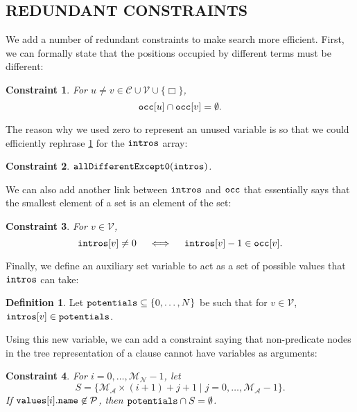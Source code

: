\documentclass[letterpaper]{article}
\newtheorem{constraint}{Constraint}
\theoremstyle{definition}
\newtheorem{definition}{Definition}
\newcommand{\variable}[1]{\texttt{\textup{#1}}}
\newcommand{\predicates}{\mathcal{P}}
\newcommand{\variables}{\mathcal{V}}
\newcommand{\constants}{\mathcal{C}}
\newcommand{\maxArity}{\mathcal{M}_{\mathcal{A}}}
\newcommand{\maxNumNodes}{\mathcal{M}_{\mathcal{N}}}
\begin{document}
\subsection{REDUNDANT CONSTRAINTS}

We add a number of redundant constraints to make search more efficient. First,
we can formally state that the positions occupied by different terms must be
different:

\begin{constraint} \label{constraint:all_diff}
  For $u \ne v \in \constants{} \cup \variables{} \cup \{ \Box \}$,
  \[
    \variable{occ}[u] \cap \variable{occ}[v] = \emptyset.
  \]
\end{constraint}

The reason why we used zero to represent an unused variable is so that we could
efficiently rephrase \cref{constraint:all_diff} for the $\variable{intros}$
array:

\begin{constraint} \label{constraint:diffbutzero}
  $\variable{allDifferentExcept0}(\variable{intros})$.
\end{constraint}

We can also add another link between $\variable{intros}$ and $\variable{occ}$
that essentially says that the smallest element of a set is an element of the
set:

\begin{constraint}
  For $v \in \variables{}$,
  \[
    \variable{intros}[v] \ne 0 \quad \iff \quad
    \variable{intros}[v] - 1 \in \variable{occ}[v].
  \]
\end{constraint}


Finally, we define an auxiliary set variable to act as a set of possible values
that $\variable{intros}$ can take:

\begin{definition}
  Let $\variable{potentials} \subseteq \{ 0, \dots, N \}$ be such that for $v
  \in \variables{}$, $\variable{intros}[v] \in \variable{potentials}$.
\end{definition}

Using this new variable, we can add a constraint saying that non-predicate nodes
in the tree representation of a clause cannot have variables as arguments:

\begin{constraint} \label{constraint:potentialIntroductions}
  For $i = 0, \dots, \maxNumNodes{} - 1$, let
  \[
    S = \{ \maxArity{} \times (i + 1) + j + 1 \mid j = 0, \dots, \maxArity{} - 1
    \}.
  \]
  If $\variable{values}[i].\variable{name} \not\in \predicates{}$, then
  $\variable{potentials} \cap S = \emptyset$.
\end{constraint}
\end{document}
